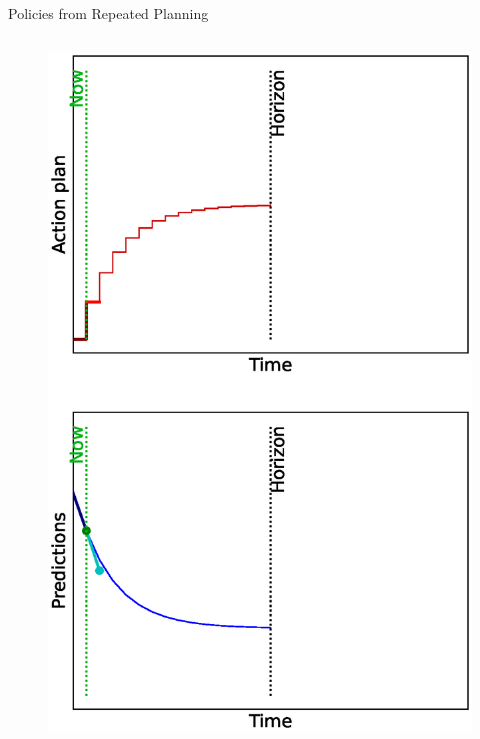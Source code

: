 \documentclass[lecture]{beamer}
\begin{document}
\begin{frame}{\normalsize Policies from Repeated Planning}
\begin{columns}
\begin{overlayarea}{\textwidth}{0.9\textheight}
\begin{figure}
{         \includegraphics[width=\FS\textwidth,clip]{Codes/MPC/MPC1.eps}
        }%
        {%
}
\end{figure}
\end{overlayarea}
\end{columns}
\end{frame}
\end{document}
